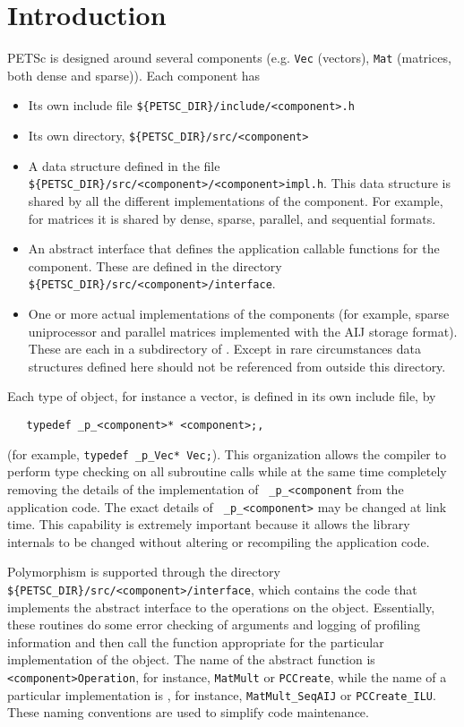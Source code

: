 \section{Introduction}

PETSc is designed around several components (e.g. {\tt Vec} (vectors),
{\tt Mat} (matrices, both dense and sparse)). Each component has
\begin{itemize}
\item Its own include file {\tt \$\{PETSC\_DIR\}/include/<component>.h} 
\item Its own directory, {\tt \$\{PETSC\_DIR\}/src/<component>}
\item A data structure defined in  the file
      {\tt \$\{PETSC\_DIR\}/src/<component>/<component>impl.h}.
      This data structure is shared by all the different implementations of the 
      component. For example, for matrices it is shared by dense,
      sparse, parallel, and sequential formats.
\item An abstract interface that defines the application callable 
      functions for the component. These are defined in the directory
      {\tt \$\{PETSC\_DIR\}/src/<component>/interface}.
\item One or more actual implementations of the components (for example,
      sparse uniprocessor and parallel matrices implemented with the AIJ storage format).
      These are each in a subdirectory of 
      . Except in rare circumstances data 
      structures defined here should not be referenced from outside this 
      directory.
\end{itemize}

Each type of object, for instance a vector, is defined in its own
include file, by 
\begin{verbatim}
   typedef _p_<component>* <component>;,
\end{verbatim}
(for example, {\tt typedef \_p\_Vec* Vec;}).  This organization
allows the compiler to perform type checking on all subroutine calls
while at the same time
completely removing the details of the implementation of {\tt
\_p\_<component} from the application code. The exact details of {\tt
\_p\_<component>} may be changed at link time. This capability is extremely important
because it allows the library internals to be changed
without altering or recompiling the application code.

Polymorphism is supported through the directory {\tt \$\{PETSC\_DIR\}/src/<component>/interface},
which contains the code that implements the abstract interface to the
operations on the object.  Essentially, these routines do some error
checking of arguments and logging of profiling information 
and then call the function appropriate for the
particular implementation of the object. The name of the abstract
function is {\tt <component>Operation}, for instance, {\tt MatMult} or {\tt PCCreate}, while
the name of a particular implementation is 
, for instance, 
{\tt MatMult\_SeqAIJ} or {\tt PCCreate\_ILU}. These naming
conventions are used to simplify code maintenance.

